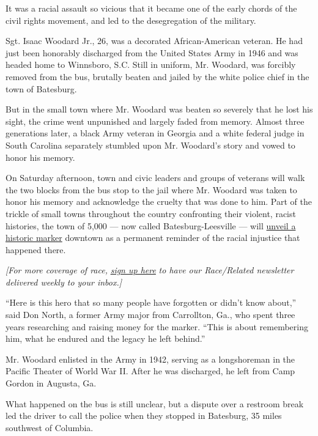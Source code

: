 It was a racial assault so vicious that it became one of the early
chords of the civil rights movement, and led to the desegregation of the
military.

Sgt. Isaac Woodard Jr., 26, was a decorated African-American veteran. He
had just been honorably discharged from the United States Army in 1946
and was headed home to Winnsboro, S.C. Still in uniform, Mr. Woodard,
was forcibly removed from the bus, brutally beaten and jailed by the
white police chief in the town of Batesburg.

But in the small town where Mr. Woodard was beaten so severely that he
lost his sight, the crime went unpunished and largely faded from memory.
Almost three generations later, a black Army veteran in Georgia and a
white federal judge in South Carolina separately stumbled upon Mr.
Woodard's story and vowed to honor his memory.

On Saturday afternoon, town and civic leaders and groups of veterans
will walk the two blocks from the bus stop to the jail where Mr. Woodard
was taken to honor his memory and acknowledge the cruelty that was done
to him. Part of the trickle of small towns throughout the country
confronting their violent, racist histories, the town of 5,000 --- now
called Batesburg-Leesville --- will
\href{https://www.postandcourier.com/columnists/column-a-cop-gouged-out-a-black-vet-s-eyes/article_b112cf02-2a7d-11e9-ad8c-07e0bc45c3aa.html}{unveil
a historic marker} downtown as a permanent reminder of the racial
injustice that happened there.

\emph{{[}For more coverage of race,}
\emph{\href{https://www.nytimes.com/2018/10/01/us/subscribe-race-related-newsletter.html?action=click\&module=inline\&pgtype=Article}{sign
up here}} \emph{to have our Race/Related newsletter delivered weekly to
your inbox.{]}}

``Here is this hero that so many people have forgotten or didn't know
about,'' said Don North, a former Army major from Carrollton, Ga., who
spent three years researching and raising money for the marker. ``This
is about remembering him, what he endured and the legacy he left
behind.''

Mr. Woodard enlisted in the Army in 1942, serving as a longshoreman in
the Pacific Theater of World War II. After he was discharged, he left
from Camp Gordon in Augusta, Ga.

What happened on the bus is still unclear, but a dispute over a restroom
break led the driver to call the police when they stopped in Batesburg,
35 miles southwest of Columbia.

